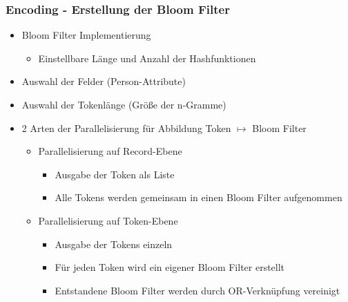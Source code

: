 \documentclass{beamer}
\begin{document}
    \begin{frame}
    		\frametitle{Encoding - Erstellung der Bloom Filter}
    		\begin{itemize}
    			\item Bloom Filter Implementierung
    			\begin{itemize}
    				\item Einstellbare Länge und Anzahl der Hashfunktionen
    			\end{itemize}
    			\item Auswahl der Felder (Person-Attribute)
    			\item Auswahl der Tokenlänge (Größe der n-Gramme)
    			\item 2 Arten der Parallelisierung für Abbildung Token $\mapsto$ Bloom Filter
    			\begin{itemize}
    				\item Parallelisierung auf Record-Ebene
    				\begin{itemize}
    					\item Ausgabe der Token als Liste
    					\item Alle Tokens werden gemeinsam in einen Bloom Filter aufgenommen
    				\end{itemize}
    				\item Parallelisierung auf Token-Ebene
    				\begin{itemize}
    					\item Ausgabe der Tokens einzeln
    					\item Für jeden Token wird ein eigener Bloom Filter erstellt
    					\item Entstandene Bloom Filter werden durch OR-Verknüpfung vereinigt
    				\end{itemize}
    			\end{itemize}
    		\end{itemize}
    \end{frame}
    
\end{document}
